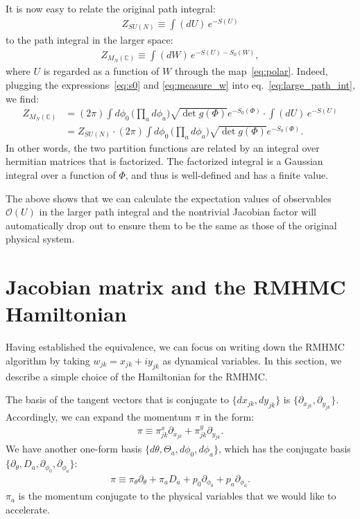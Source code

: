 \documentclass[12pt]{article}
\begin{document}
It is now easy to relate the original path integral:
\begin{align}
  Z_{SU(N)}
  \equiv
  \int(dU)\,
  e^{-S(U)}
\end{align}
to the path integral in the larger space:
\begin{align}
  Z_{M_N(\mathbb{C})}
  \equiv
  \int (dW)\,
  e^{ - S(U)- S_0(W)},
  \label{eq:large_path_int}
\end{align}
where $U$ is regarded as a function of $W$ through the map~\eqref{eq:polar}.
Indeed, plugging the expressions~\eqref{eq:s0} and \eqref{eq:measure_w}
into eq.~\eqref{eq:large_path_int}, we find:
\begin{align}
  Z_{M_N(\mathbb{C})}
  &=
    (2\pi)
    \int
    d\phi_0
    \,
    \Big(\prod_a d\phi_a\Big)
    \sqrt{\det g(\Phi)}
    e^{-S_0(\Phi)}
    \cdot
    \int
    (dU)\, e^{-S(U)} \nonumber \\
  &=
    Z_{SU(N)}
    \cdot
    (2\pi)
    \int
    d\phi_0
    \,
    \Big(\prod_a d\phi_a\Big)
    \sqrt{\det g(\Phi)}
    e^{-S_0(\Phi)}.
\end{align}
In other words,
the two partition functions are related by
an integral over hermitian matrices
that is factorized.
The factorized integral is a Gaussian integral
over a function of $\Phi$, and thus
is well-defined and has a finite value.

The above shows that we can calculate the expectation values of
observables ${\mathcal O}(U)$ in the larger path integral
and the nontrivial Jacobian factor will automatically drop out
to ensure them to be the same as those of the original physical system.



\section{Jacobian matrix and the RMHMC Hamiltonian}
\label{sec:rmhmc_hamil}

Having established the equivalence,
we can focus on writing down the
RMHMC algorithm by taking
$w_{jk}=x_{jk}+iy_{jk}$ as dynamical variables.
In this section, we describe a simple
choice of the Hamiltonian for the RMHMC.

The basis of the tangent vectors
that is conjugate to $\{dx_{jk}, dy_{jk}\}$
is $\{\partial_{x_{jk}}, \partial_{y_{jk}} \}$.
Accordingly, we can expand the momentum $\pi$ in the form:
\begin{align}
  \pi
  \equiv
  \pi^x_{jk}\partial_{x_{jk}}
  +
  \pi^y_{jk}\partial_{y_{jk}}.
\end{align}
We have another one-form basis
$\{d\theta, \Theta_a, d\phi_0, d\phi_a\}$,
which has the conjugate basis
$\{\partial_\theta, D_a, \partial_{\phi_0}, \partial_{\phi_a} \}$:
\begin{align}
  \pi
  \equiv
  \pi_\theta \partial_{\theta}
  +
  \pi_a D_a
  +
  p_0 \partial_{\phi_0}
  +
  p_a \partial_{\phi_a}.
\end{align}
$\pi_a$ is the momentum conjugate to the physical variables
that we would like to accelerate.
\end{document}
